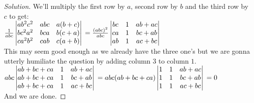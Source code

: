 \begin{proof}
    [Solution]
    We'll multiply the first row by $a$, second row by $b$ and the third row by $c$ to get:\\
    $\frac{1}{abc}\begin{vmatrix}
    ab^2c^2 & abc & a(b+c) \\
    bc^2a^2 & bca & b(c+a) \\
    ca^2b^2 & cab & c(a+b) \\
\end{vmatrix}\\
= \frac{(abc)^2}{abc}\begin{vmatrix}
    bc & 1 & ab+ac \\
    ca & 1 & bc+ab \\
    ab & 1 & ac+bc \\
\end{vmatrix}$\\
This may seem good enough as we already have the three one's but we are gonna utterly humiliate the question by adding column $3$ to column $1$. \\
$abc\begin{vmatrix}
    ab+bc+ca & 1 & ab+ac \\
    ab+bc+ca & 1 & bc+ab \\
    ab+bc+ca & 1 & ac+bc \\
\end{vmatrix}\\
= abc(ab+bc+ca)\begin{vmatrix}
    1 & 1 & ab+ac \\
    1 & 1 & bc+ab \\
    1 & 1 & ac+bc \\
\end{vmatrix}\\
= 0$\\
And we are done.
\end{proof}
